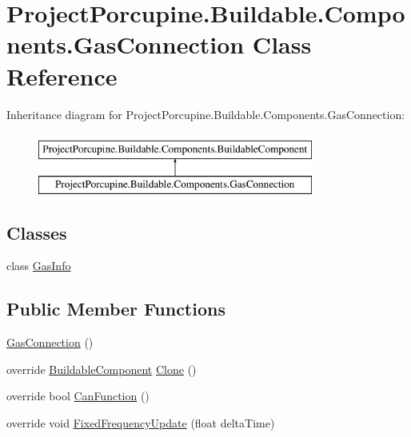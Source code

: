\hypertarget{class_project_porcupine_1_1_buildable_1_1_components_1_1_gas_connection}{}\section{Project\+Porcupine.\+Buildable.\+Components.\+Gas\+Connection Class Reference}
\label{class_project_porcupine_1_1_buildable_1_1_components_1_1_gas_connection}
Inheritance diagram for Project\+Porcupine.\+Buildable.\+Components.\+Gas\+Connection\+:\begin{figure}[H]
\begin{center}
\leavevmode
\includegraphics[height=2.000000cm]{class_project_porcupine_1_1_buildable_1_1_components_1_1_gas_connection}
\end{center}
\end{figure}
\subsection*{Classes}
\begin{DoxyCompactItemize}
\item 
class \hyperlink{class_project_porcupine_1_1_buildable_1_1_components_1_1_gas_connection_1_1_gas_info}{Gas\+Info}
\end{DoxyCompactItemize}
\subsection*{Public Member Functions}
\begin{DoxyCompactItemize}
\item 
\hyperlink{class_project_porcupine_1_1_buildable_1_1_components_1_1_gas_connection_a45d441c5af5d7e475b39793c3b8aa58d}{Gas\+Connection} ()
\item 
override \hyperlink{class_project_porcupine_1_1_buildable_1_1_components_1_1_buildable_component}{Buildable\+Component} \hyperlink{class_project_porcupine_1_1_buildable_1_1_components_1_1_gas_connection_a7e4de83edc3f1d37663e14f5601c00e7}{Clone} ()
\item 
override bool \hyperlink{class_project_porcupine_1_1_buildable_1_1_components_1_1_gas_connection_a12332ec93cb8ad81b48f5b362810c281}{Can\+Function} ()
\item 
override void \hyperlink{class_project_porcupine_1_1_buildable_1_1_components_1_1_gas_connection_a999f07a477a5d042ae0b53ede65b34dd}{Fixed\+Frequency\+Update} (float delta\+Time)
\end{DoxyCompactItemize}

